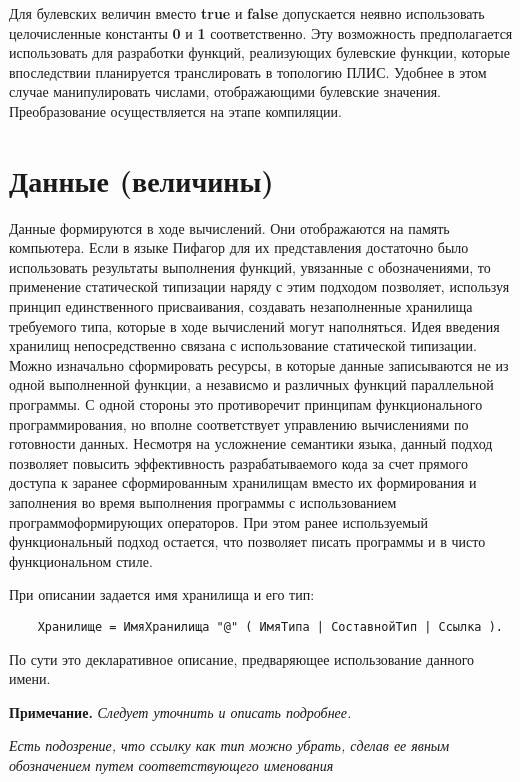 {Для булевских величин вместо \textbf{true} и \textbf{false} допускается неявно использовать целочисленные константы \textbf{0} и \textbf{1} соответственно. Эту возможность предполагается использовать для разработки функций, реализующих булевские функции, которые впоследствии планируется транслировать в топологию ПЛИС. Удобнее в этом случае манипулировать числами, отображающими булевские значения. Преобразование осуществляется на этапе компиляции.

\section{Данные (величины)}

Данные формируются в ходе вычислений. Они отображаются на память компьютера. Если в языке Пифагор для их представления достаточно было использовать результаты выполнения функций, увязанные с обозначениями, то применение статической типизации наряду с этим подходом позволяет, используя принцип единственного присваивания, создавать незаполненные хранилища требуемого типа, которые в ходе вычислений могут наполняться. Идея введения хранилищ непосредственно связана с использование статической типизации. Можно изначально сформировать ресурсы, в которые данные записываются не из одной выполненной функции, а независмо и различных функций параллельной программы. С одной стороны это противоречит принципам функционального программирования, но вполне соответствует управлению вычислениями по готовности данных. Несмотря на усложнение семантики языка, данный подход позволяет повысить эффективность разрабатываемого кода за счет прямого доступа к заранее сформированным хранилищам вместо их формирования и заполнения во время выполнения программы с использованием программоформирующих операторов. При этом ранее используемый функциональный подход остается, что позволяет писать программы и в чисто функциональном стиле.

При описании задается имя хранилища и его тип:

\begin{verbatim}
    Хранилище = ИмяХранилища "@" ( ИмяТипа | СоставнойТип | Ссылка ).
\end{verbatim}

По сути это декларативное описание, предваряющее использование данного имени.

\textbf{Примечание.}
\textit{Следует уточнить и описать подробнее.}

\textit{Есть подозрение, что ссылку как тип можно убрать, сделав ее явным обозначением путем соответствующего именования}

}
